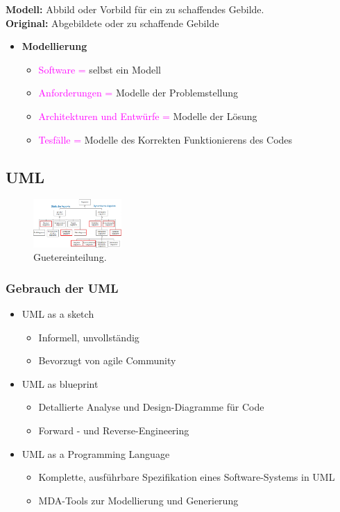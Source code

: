 \documentclass[../ZF_SWEN1.tex]{subfiles}
\begin{document}
\textbf{Modell: } Abbild oder Vorbild für ein zu schaffendes  Gebilde.\\
\textbf{Original: } Abgebildete oder zu schaffende Gebilde \\

\begin{itemize} 
    \item \textbf{Modellierung} 
    \begin{itemize}
        \item \textcolor {magenta}{Software =} selbst ein Modell
        \item \textcolor {magenta}{Anforderungen =} Modelle der Problemstellung
        \item \textcolor {magenta}{Architekturen und Entwürfe =} Modelle der Lösung
        \item \textcolor {magenta}{Tesfälle =} Modelle des Korrekten Funktionierens des Codes
    \end{itemize}

\end{itemize}

\subsection{UML}

\begin{figure}[H]
\centering
\includegraphics[width=0.3\textwidth]{Resources/Images/UML_Diagramme.png}
\caption{\label{fig:Guetereinteilung}Guetereinteilung.}
\end{figure}

\subsubsection{Gebrauch der UML}
\begin{itemize}
	\item UML as a sketch
	\begin{itemize}
		\item Informell, unvollständig
		\item Bevorzugt von agile Community
	\end{itemize}
	\item UML as blueprint
	\begin{itemize}
		\item Detallierte Analyse und Design-Diagramme für Code  
		\item Forward - und Reverse-Engineering
	\end{itemize}
	\item UML as a Programming Language
	\begin{itemize}
		\item Komplette, ausführbare Spezifikation eines Software-Systems in UML
		\item MDA-Tools zur Modellierung und Generierung
	\end{itemize}

\end{itemize}
\end{document}
